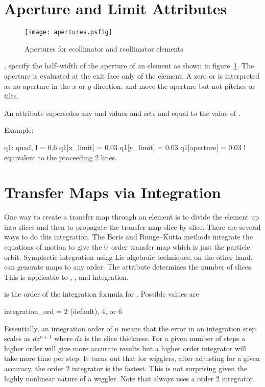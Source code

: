 \section{Aperture and Limit Attributes}
\label{s:limit}

\begin{figure}
  \centering
  \texttt{[image: apertures.psfig]}
  \caption{Apertures for ecollimator and rcollimator elements}
  \label{f:limit}
\end{figure}

,  specify the half--width of the 
aperture of an element as shown in figure~\ref{f:limit}. 
The aperture is evaluated at the exit
face only of the element. A zero  or 
is interpreted as no aperture in the $x$ or $y$ direction.
 and  move the aperture but not pitches or tilts.

An  attribute supersedes
any  and  values and sets  and
 equal to the value of .

\noindent
Example:
\begin{example}
  q1: quad, l = 0.6
  q1[x_limit] = 0.03
  q1[y_limit] = 0.03
  q1[aperture] = 0.03  ! equivalent to the proceeding 2 lines.  
\end{example}

\section{Transfer Maps via Integration}
\label{s:integ}

One way to create a transfer map through an element is to divide the
element up into slices and then to propagate the transfer
map slice by slice.
There are several ways to do this integration. The Boris and Runge--Kutta 
methods integrate the equations of motion to give the 0\Th\ order
transfer map which is just the particle orbit.
Symplectic integration using Lie algebraic techniques, on the other hand, 
can generate maps to any order.
The  attribute determines the number of slices. This is
applicable to , , and 
integration. 

 is the order of the integration formula for 
. Possible values are
\begin{example}
  integration\_ord = 2 (default), 4, or 6
\end{example}
Essentially, an integration order of $n$ means that the error in an 
integration step scales as $dz^{n+1}$ where $dz$ is the slice thickness.
For a given number of steps a higher order will give more accurate results
but a higher order integrator will take more time per step. It turns out
that for wigglers, after adjusting  for a given accuracy, 
the order 2 integrator is the fastest. This is not surprising given the
highly nonlinear nature of a wiggler. Note that  always
uses a order 2 integrator.

